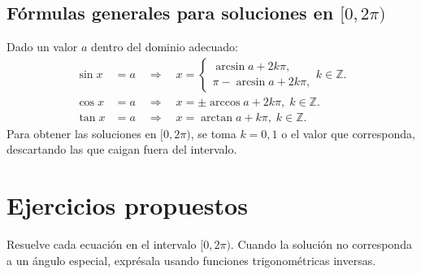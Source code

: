 \documentclass[12pt,a4paper]{article}
\begin{document}
\subsection{Fórmulas generales para soluciones en $[0,2\pi)$}
Dado un valor $a$ dentro del dominio adecuado:
\begin{align*}
\sin x &= a \quad \Rightarrow \quad x = 
\begin{cases}
\arcsin a + 2k\pi,\\
\pi - \arcsin a + 2k\pi,
\end{cases} k\in\mathbb{Z}.\\
\cos x &= a \quad \Rightarrow \quad x = 
\pm \arccos a + 2k\pi,\; k\in\mathbb{Z}.\\
\tan x &= a \quad \Rightarrow \quad x = 
\arctan a + k\pi,\; k\in\mathbb{Z}.
\end{align*}
Para obtener las soluciones en $[0,2\pi)$, se toma $k=0,1$ o el valor que corresponda, descartando las que caigan fuera del intervalo.

\newpage
\section{Ejercicios propuestos}
Resuelve cada ecuación en el intervalo $[0,2\pi)$. Cuando la solución no corresponda a un ángulo especial, exprésala usando funciones trigonométricas inversas.
\end{document}
